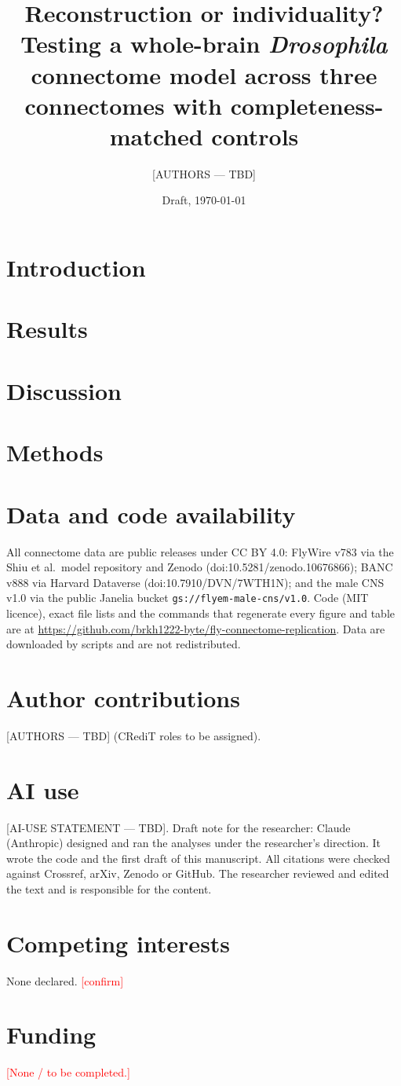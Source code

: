 \documentclass[11pt]{article}
\title{Reconstruction or individuality? Testing a whole-brain \textit{Drosophila}
connectome model across three connectomes with completeness-matched controls}
\author{[AUTHORS --- TBD]}
\date{Draft, \today}
\newcommand{\todo}[1]{\textcolor{red}{[#1]}}
\begin{document}
\maketitle



\section{Introduction}


\section{Results}


\section{Discussion}


\section{Methods}


\section*{Data and code availability}
All connectome data are public releases under CC BY 4.0: FlyWire v783
\citep{dorkenwald2024,schlegel2024} via the Shiu et al.\ model repository and Zenodo
(doi:10.5281/zenodo.10676866); BANC v888 \citep{bates2026} via Harvard Dataverse
(doi:10.7910/DVN/7WTH1N); and the male CNS v1.0 \citep{berg2026} via the public Janelia bucket
\texttt{gs://flyem-male-cns/v1.0}. Code (MIT licence), exact file lists and the commands that
regenerate every figure and table are at
\url{https://github.com/brkh1222-byte/fly-connectome-replication}. Data are downloaded by
scripts and are not redistributed.

\section*{Author contributions}
[AUTHORS --- TBD] (CRediT roles to be assigned).

\section*{AI use}
[AI-USE STATEMENT --- TBD]. Draft note for the researcher: Claude (Anthropic) designed and
ran the analyses under the researcher's direction. It wrote the code and the first draft of
this manuscript. All citations were checked against Crossref, arXiv, Zenodo or GitHub. The
researcher reviewed and edited the text and is responsible for the content.

\section*{Competing interests}
None declared. \todo{confirm}

\section*{Funding}
\todo{None / to be completed.}



\end{document}
